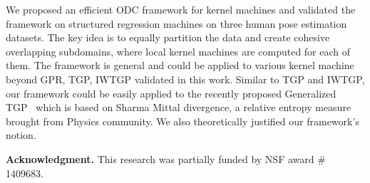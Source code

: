 We proposed an efficient ODC framework for kernel machines and validated the framework on structured regression machines on three human pose estimation datasets. The key idea is to equally  partition the data and create cohesive overlapping subdomains, where local kernel machines are computed for each of them. The framework is general and could be applied to various kernel machine beyond GPR, TGP, IWTGP validated in this work. Similar to TGP and IWTGP, our framework could be easily applied to the recently proposed Generalized  TGP~\cite{SMTGP_Elhoseiny15} which is based on Sharma Mittal divergence, a relative entropy measure brought from Physics community. We also theoretically justified  our framework's notion. 

\noindent \textbf{Acknowledgment.} This research was partially funded by NSF award \# 1409683.


